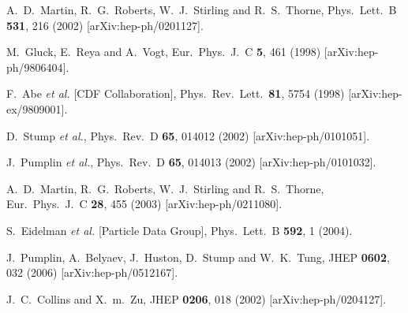 \documentclass[12pt]{iopart}
\begin{document}
\begin{thebibliography}{99}
  A.~D.~Martin, R.~G.~Roberts, W.~J.~Stirling and R.~S.~Thorne,
  Phys.\ Lett.\ B {\bf 531}, 216 (2002)
  [arXiv:hep-ph/0201127].

  M.~Gluck, E.~Reya and A.~Vogt,
  Eur.\ Phys.\ J.\ C {\bf 5}, 461 (1998)
  [arXiv:hep-ph/9806404].

  F.~Abe {\it et al.}  [CDF Collaboration],
  Phys.\ Rev.\ Lett.\  {\bf 81}, 5754 (1998)
  [arXiv:hep-ex/9809001].



  D.~Stump {\it et al.},
  Phys.\ Rev.\ D {\bf 65}, 014012 (2002)
  [arXiv:hep-ph/0101051].

  J.~Pumplin {\it et al.},
  Phys.\ Rev.\ D {\bf 65}, 014013 (2002)
  [arXiv:hep-ph/0101032].

  A.~D.~Martin, R.~G.~Roberts, W.~J.~Stirling and R.~S.~Thorne,
  Eur.\ Phys.\ J.\ C {\bf 28}, 455 (2003)
  [arXiv:hep-ph/0211080].

  S.~Eidelman {\it et al.}  [Particle Data Group],
  Phys.\ Lett.\ B {\bf 592}, 1 (2004).

  J.~Pumplin, A.~Belyaev, J.~Huston, D.~Stump and W.~K.~Tung,
  JHEP {\bf 0602}, 032 (2006)
  [arXiv:hep-ph/0512167].


  J.~C.~Collins and X.~m.~Zu,
  JHEP {\bf 0206}, 018 (2002)
  [arXiv:hep-ph/0204127].


\end{thebibliography}
\end{document}
